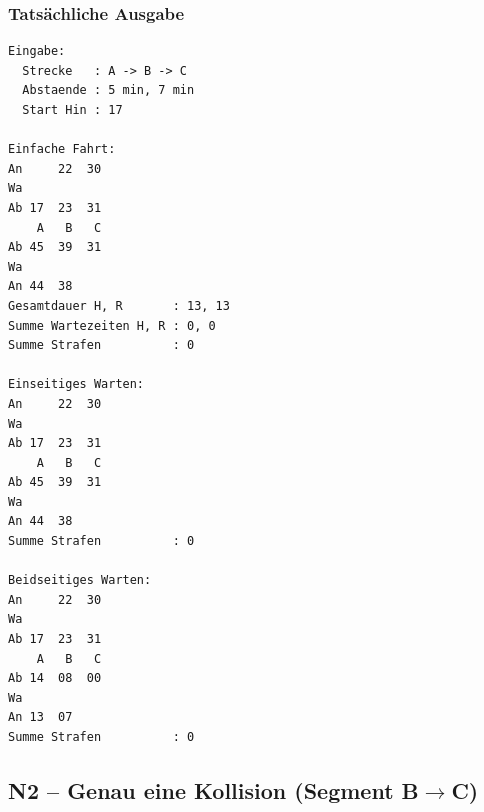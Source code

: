 \documentclass[12pt,a4paper]{article}
\begin{document}
\begin{minipage}[t]{0.48\textwidth}
\scriptsize
\subsubsection*{Tatsächliche Ausgabe}
\begin{lstlisting}
Eingabe:
  Strecke   : A -> B -> C
  Abstaende : 5 min, 7 min
  Start Hin : 17

Einfache Fahrt:
An     22  30
Wa
Ab 17  23  31
    A   B   C
Ab 45  39  31
Wa
An 44  38
Gesamtdauer H, R       : 13, 13
Summe Wartezeiten H, R : 0, 0
Summe Strafen          : 0

Einseitiges Warten:
An     22  30
Wa
Ab 17  23  31
    A   B   C
Ab 45  39  31
Wa
An 44  38
Summe Strafen          : 0

Beidseitiges Warten:
An     22  30
Wa
Ab 17  23  31
    A   B   C
Ab 14  08  00
Wa
An 13  07
Summe Strafen          : 0
\end{lstlisting}
\end{minipage}

\subsection{N2 – Genau eine Kollision (Segment B$\to$C)}
\label{test:n2}
\end{document}
